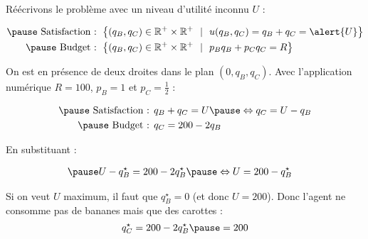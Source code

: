 \documentclass[9pt,professionalfonts,handout,hyperref]{beamer}
\begin{document}
\begin{frame}

Réécrivons le problème avec un niveau d'utilité inconnu $U$ :
	
	\[\begin{aligned}
\pause 	\text{ Satisfaction :   }&\left\{(q_B, q_C) \in \mathbb{R}^{+}\times\mathbb{R}^{+} ~~|~~u(q_B, q_C) = q_B + q_C = \alert{U} \right\} \\
\pause 	\text{ Budget :   }&\left\{(q_B, q_C) \in \mathbb{R}^{+}\times\mathbb{R}^{+} ~~|~~p_Bq_B + p_Cq_C=R\right\}
	\end{aligned}\]
	
	\bigskip 
	
\pause 	On est en présence de deux droites dans le plan $(0,q_B,q_C)$. Avec l'application numérique $R =100$, $p_B= 1$ et $p_C = \frac{1}{2}$ :
	
	\[\begin{aligned}
\pause 	\text{ Satisfaction :   }&q_B + q_C = U \pause \Leftrightarrow q_C = U-q_B \\
\pause 	\text{ Budget :   }&q_C = 200-2q_B
	\end{aligned}\]
	
\pause  En substituant :
	
	\[\begin{aligned}
\pause 	&U-q_B^\star = 200-2q_B^\star \pause \Leftrightarrow U = 200-q_B^\star
	\end{aligned}\]
	
\pause Si on veut $U$ maximum, \pause il faut que $q_B^\star = 0$ \pause (et donc $U=200$). \pause Donc l'agent ne consomme pas de bananes \pause mais que des carottes : \pause $$q_C^\star = 200-2q_B^\star \pause = 200$$
	
\end{frame}
\end{document}
